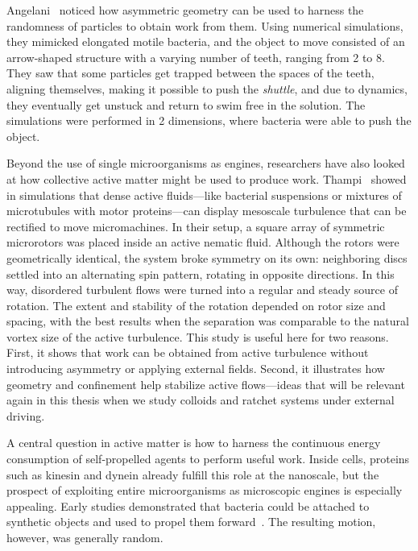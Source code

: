 Angelani~\cite{angelani2010geometrically} noticed how asymmetric geometry can be used to harness the randomness of particles to obtain work from them. Using numerical simulations, they mimicked elongated motile bacteria, and the object to move consisted of an arrow-shaped structure with a varying number of teeth, ranging from 2 to 8. They saw that some particles get trapped between the spaces of the teeth, aligning themselves, making it possible to push the \textit{shuttle}, and due to dynamics, they eventually get unstuck and return to swim free in the solution. The simulations were performed in 2 dimensions, where bacteria were able to push the object.

Beyond the use of single microorganisms as engines, researchers have also looked at how collective active matter might be used to produce work. Thampi~\cite{thampi2016active} showed in simulations that dense active fluids—like bacterial suspensions or mixtures of microtubules with motor proteins—can display mesoscale turbulence that can be rectified to move micromachines.
In their setup, a square array of symmetric microrotors was placed inside an active nematic fluid. Although the rotors were geometrically identical, the system broke symmetry on its own: neighboring discs settled into an alternating spin pattern, rotating in opposite directions. In this way, disordered turbulent flows were turned into a regular and steady source of rotation. The extent and stability of the rotation depended on rotor size and spacing, with the best results when the separation was comparable to the natural vortex size of the active turbulence.
This study is useful here for two reasons. First, it shows that work can be obtained from active turbulence without introducing asymmetry or applying external fields. Second, it illustrates how geometry and confinement help stabilize active flows—ideas that will be relevant again in this thesis when we study colloids and ratchet systems under external driving.

A central question in active matter is how to harness the continuous energy consumption of self-propelled agents to perform useful work. Inside cells, proteins such as kinesin and dynein already fulfill this role at the nanoscale, but the prospect of exploiting entire microorganisms as microscopic engines is especially appealing. Early studies demonstrated that bacteria could be attached to synthetic objects and used to propel them forward~\cite{weibel2005microoxen, hiratsuka2006microrotary}. The resulting motion, however, was generally random.

